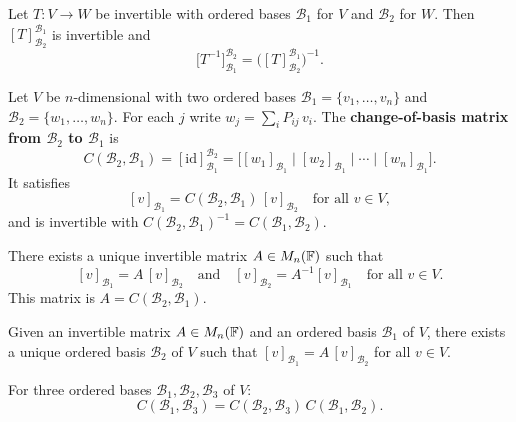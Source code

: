 \begin{corbox}
\label{cor:invertible-lt-matrix}
Let $T:V\to W$ be invertible with ordered bases $\mathcal{B}_1$ for $V$ and
$\mathcal{B}_2$ for $W$.  Then $[T]^{\mathcal{B}_1}_{\mathcal{B}_2}$ is
invertible and
\[
    \bigl[T^{-1}\bigr]^{\mathcal{B}_2}_{\mathcal{B}_1}
    = \bigl([T]^{\mathcal{B}_1}_{\mathcal{B}_2}\bigr)^{-1}.
\]
\end{corbox}

\begin{defbox}
\label{def:cob-matrix}
Let $V$ be $n$-dimensional with two ordered bases
$\mathcal{B}_1=\{v_1,\ldots,v_n\}$ and $\mathcal{B}_2=\{w_1,\ldots,w_n\}$.
For each $j$ write $w_j = \sum_i P_{ij}\,v_i$.  The \textbf{change-of-basis
matrix from $\mathcal{B}_2$ to $\mathcal{B}_1$} is
\[
    C(\mathcal{B}_2,\mathcal{B}_1)
    = [\mathrm{id}]^{\mathcal{B}_2}_{\mathcal{B}_1}
    = \bigl[[w_1]_{\mathcal{B}_1}\;\big|\;[w_2]_{\mathcal{B}_1}\;\big|\;\cdots
             \;\big|\;[w_n]_{\mathcal{B}_1}\bigr].
\]
It satisfies
\[
    [v]_{\mathcal{B}_1} = C(\mathcal{B}_2,\mathcal{B}_1)\,[v]_{\mathcal{B}_2}
    \quad\text{for all }v\in V,
\]
and is invertible with $C(\mathcal{B}_2,\mathcal{B}_1)^{-1}=C(\mathcal{B}_1,\mathcal{B}_2)$.
\end{defbox}

\begin{thmbox}
\label{thm:cob-unique}
There exists a unique invertible matrix $A\in M_{n}(\mathbb{F})$ such that
\[
    [v]_{\mathcal{B}_1} = A\,[v]_{\mathcal{B}_2}
    \quad\text{and}\quad
    [v]_{\mathcal{B}_2} = A^{-1}[v]_{\mathcal{B}_1}
    \quad\text{for all }v\in V.
\]
This matrix is $A = C(\mathcal{B}_2,\mathcal{B}_1)$.
\end{thmbox}

\begin{thmbox}
\label{thm:cob-unique-basis}
Given an invertible matrix $A\in M_{n}(\mathbb{F})$ and an ordered basis $\mathcal{B}_1$
of $V$, there exists a unique ordered basis $\mathcal{B}_2$ of $V$ such that
$[v]_{\mathcal{B}_1} = A\,[v]_{\mathcal{B}_2}$ for all $v\in V$.
\end{thmbox}

\begin{propbox}
\label{prop:cob-composition}
For three ordered bases $\mathcal{B}_1,\mathcal{B}_2,\mathcal{B}_3$ of $V$:
\[
    C(\mathcal{B}_1,\mathcal{B}_3) = C(\mathcal{B}_2,\mathcal{B}_3)\,C(\mathcal{B}_1,\mathcal{B}_2).
\]
\end{propbox}

